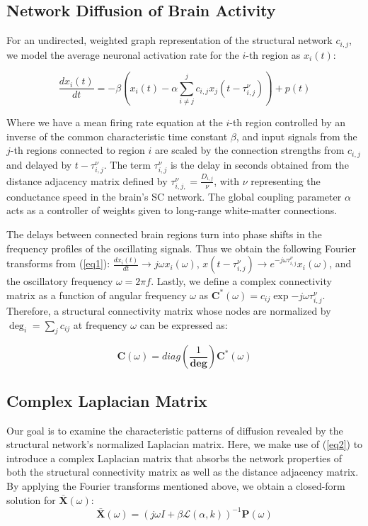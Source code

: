 \documentclass{article}
\begin{document}
\subsection{Network Diffusion of Brain Activity}
For an undirected, weighted graph representation of the structural network $c_{i,j}$, we model the average neuronal activation rate for the $i$-th region as $x_{i}(t)$:

\begin{equation} 
    \label{eq1}
    \frac{dx_{i}(t)}{dt} = -\beta (x_{i}(t) - \alpha \sum_{i \ne j}^{j} c_{i,j} x_{j}(t-\tau^{\nu}_{i,j})) + p(t)
\end{equation}

Where we have a mean firing rate equation at the $i$-th region controlled by an inverse of the common characteristic time constant $\beta$, and input signals from the $j$-th regions connected to region $i$ are scaled by the connection strengths from $c_{i,j}$ and delayed by $t-\tau^{\nu}_{i,j}$. The term $\tau^{\nu}_{i,j}$ is the delay in seconds obtained from the distance adjacency matrix defined by $\tau^{\nu}_{i,j,} = \frac{D_{i,j}}{\nu}$, with $\nu$ representing the conductance speed in the brain's SC network. The global coupling parameter $\alpha$ acts as a controller of weights given to long-range white-matter connections.

The delays between connected brain regions turn into phase shifts in the frequency profiles of the oscillating signals. Thus we obtain the following Fourier transforms from (\ref{eq1}): $\frac{dx_{i}(t)}{dt} \to j\omega x_{i}(\omega)$, $x(t-\tau^{\nu}_{i,j}) \to e^{-j\omega \tau^{\nu}_{i,j}} x_{i}(\omega)$, and the oscillatory frequency $\omega = 2 \pi f$. Lastly, we define a complex connectivity matrix as a function of angular frequency $\omega$ as $\pmb{C}^{*}(\omega)={c_{ij}\exp{-j \omega \tau^{\nu}_{i,j}}}$. Therefore, a structural connectivity matrix whose nodes are normalized by $\deg_{i} = \sum_{j} c_{ij}$ at frequency $\omega$ can be expressed as:

\begin{equation}
    \label{eq2}
    \pmb{C}(\omega) = diag(\frac{1}{\pmb{\deg}}) \pmb{C}^{*}(\omega)
\end{equation}

\subsection{Complex Laplacian Matrix}
Our goal is to examine the characteristic patterns of diffusion revealed by the structural network's normalized Laplacian matrix. Here, we make use of (\ref{eq2}) to introduce a complex Laplacian matrix that absorbs the network properties of both the structural connectivity matrix as well as the distance adjacency matrix. By applying the Fourier transforms mentioned above, we obtain a closed-form solution for $\pmb{\bar{X}}(\omega)$:
\begin{equation}
\label{eq3}
\pmb{\bar{X}}(\omega) = (j \omega I + \beta \mathcal{L}(\alpha, k))^{-1} \pmb{P}(\omega)
\end{equation}
\end{document}
